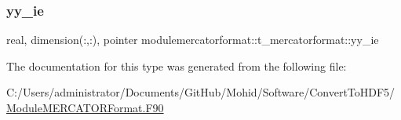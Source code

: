 \subsubsection{\texorpdfstring{yy\+\_\+ie}{yy\_ie}}
{\footnotesize\ttfamily real, dimension(\+:,\+:), pointer modulemercatorformat\+::t\+\_\+mercatorformat\+::yy\+\_\+ie\hspace{0.3cm}{\ttfamily [private]}}



The documentation for this type was generated from the following file\+:\begin{DoxyCompactItemize}
\item 
C\+:/\+Users/administrator/\+Documents/\+Git\+Hub/\+Mohid/\+Software/\+Convert\+To\+H\+D\+F5/\mbox{\hyperlink{_module_m_e_r_c_a_t_o_r_format_8_f90}{Module\+M\+E\+R\+C\+A\+T\+O\+R\+Format.\+F90}}\end{DoxyCompactItemize}
